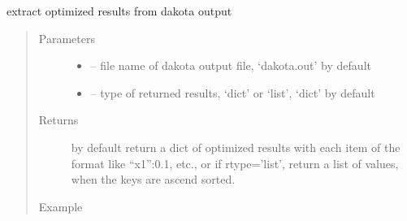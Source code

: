 \documentclass[letterpaper,10pt,english]{sphinxmanual}
\begin{document}

\begin{fulllineitems}
\label{\detokenize{src/apidocs/dakutils:genopt.dakutils.get_opt_results}}
extract optimized results from dakota output
\begin{quote}\begin{description}
\item[{Parameters}] \leavevmode\begin{itemize}
\item {} 
 -- file name of dakota output file, 
`dakota.out' by default

\item {} 
 -- type of returned results, `dict' or `list', 
`dict' by default

\end{itemize}

\item[{Returns}] \leavevmode
by default return a dict of optimized results with each item
of the format like ``x1'':0.1, etc., or if rtype='list', return a 
list of values, when the keys are ascend sorted.

\item[{Example}] \leavevmode
\end{description}\end{quote}

\begin{sphinxVerbatim}[commandchars=\\\{\},formatcom=\scriptsize]
   
   
\end{sphinxVerbatim}

\end{fulllineitems}
\end{document}
